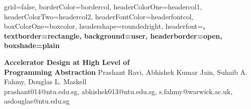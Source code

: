 \documentclass[a0paper,portrait]{baposter}
\begin{document}


\begin{poster}{
	grid=false,
	borderColor=bordercol,
	headerColorOne=headercol1,
	headerColorTwo=headercol2,
	headerFontColor=headerfontcol,
	boxColorOne=boxcolor,
	headershape=roundedright,
	headerfont=\large\sf\bf,
	textborder=rectangle,
	background=user,
	headerborder=open,
  boxshade=plain
}
{
	\setlength\fboxsep{0pt}
	\setlength\fboxrule{0pt}
	
}
{\huge\sf\bf
Accelerator Design at High Level of \\ Programming Abstraction 
}
{
	\vspace{0.3em} Prashant Ravi, Abhishek Kumar Jain, Suhaib A. Fahmy, Douglas L. Maskell\\
	{\smaller prashant014@ntu.edu.sg, abhishek013@ntu.edu.sg, s.fahmy@warwick.ac.uk, asdouglas@ntu.edu.sg}
}




\end{poster}
\end{document}
